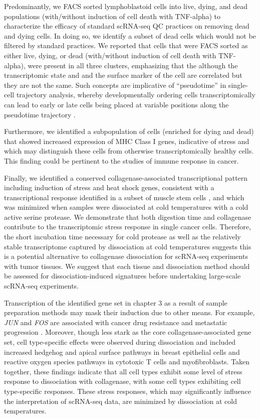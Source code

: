 Predominantly, we FACS sorted lymphoblastoid cells into live, dying, and dead populations (with/without induction of cell death with TNF-alpha) to characterize the efficacy of standard scRNA-seq QC practices on removing dead and dying cells. In doing so, we identify a subset of dead cells which would not be filtered by standard practices. We reported that cells that were FACS sorted as either live, dying, or dead (with/without induction of cell death with TNF-alpha), were present in all three clusters, emphasizing that the although the transcriptomic state and and the surface marker of the cell are correlated but they are not the same. Such concepts are implicative  of ``pseudotime'' in single-cell trajectory analysis, whereby developmentally ordering cells transcriptomically can lead to early or late cells being placed at variable positions along the pseudotime trajectory \cite{campbell2018descriptive, campbell2018uncovering}. 


 Furthermore, we identified a subpopulation of cells (enriched for dying and dead) that showed increased expression of MHC Class I genes, indicative of stress and which may distinguish these cells from otherwise transcriptomically healthy cells. This finding could be pertinent to the studies of immune response in cancer.
 

 Finally, we identified a conserved collagenase-associated transcriptional pattern including induction of stress and heat shock genes, consistent with a transcriptional response identified in a subset of muscle stem cells \cite{van2017single}, and which was minimized when samples were dissociated at cold temperatures with a cold active serine protease. We demonstrate that both digestion time and collagenase contribute to the transcriptomic stress response in single cancer cells. Therefore, the short incubation time necessary for cold protease as well as the relatively stable transcriptome captured by dissociation at cold temperatures suggests this is a potential alternative to collagenase dissociation for scRNA-seq experiments with tumor tissues. We suggest that each tissue and dissociation method should be assessed for dissociation-induced signatures before undertaking large-scale scRNA-seq experiments. 
 
 Transcription of the identified gene set in chapter 3 as a result of sample preparation methods may mask their induction due to other means. For example, \textit{JUN} and \textit{FOS} are associated with cancer drug resistance and metastatic progression \cite{insua2018stress,fan2017ap, ramsdale2015transcription}. Moreover, though less stark as the core collagenase-associated gene set, cell type-specific effects were observed during dissociation and included increased hedgehog and apical surface pathways in breast epithelial cells and reactive oxygen species pathways in cytotoxic T cells and myofibroblasts. Taken together, these findings indicate that all cell types exhibit some level of stress response to dissociation with collagenase, with some cell types exhibiting cell type-specific responses. These stress responses, which may significantly influence the interpretation of scRNA-seq data, are minimized by dissociation at cold temperatures.
 


